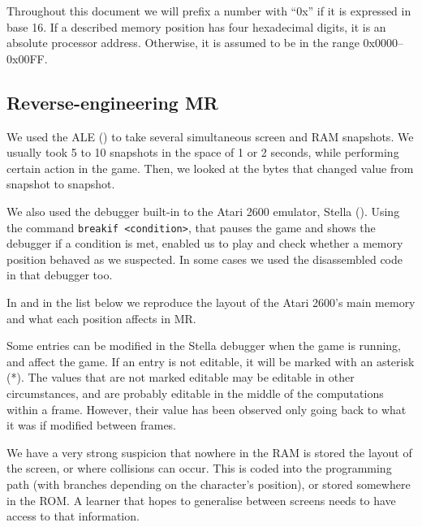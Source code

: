 Throughout this document we will prefix a number with ``0x'' if it is expressed
in base 16. If a described memory position has four hexadecimal digits, it is an
absolute processor address. Otherwise, it is assumed to be in the range
0x0000--0x00FF.


\subsection{Reverse-engineering \acl{MR}\label{subsec:rev-eng-mr}}
We used the \acl{ALE} (\cite{bellemare2013arcade}) to take several simultaneous
screen and \ac{RAM} snapshots. We usually took 5 to 10 snapshots in the space of
1 or 2 seconds, while performing certain action in the game. Then, we looked at
the bytes that changed value from snapshot to snapshot.

We also used the debugger built-in to the Atari 2600 emulator, Stella
(\cite{stella}). Using the command \verb-breakif <condition>-, that pauses the
game and shows the debugger if a condition is met, enabled us to play and check
whether a memory position behaved as we suspected. In some cases we used the
disassembled code in that debugger too.

In  and in the list below we reproduce the layout of
the Atari 2600's main memory and what each position affects in \acl{MR}.

Some entries can be modified in the Stella debugger when the game is running,
and affect the game. If an entry is not editable, it will be marked with an
asterisk (*). The values that are not marked editable may be editable in other
circumstances, and are probably editable in the middle of the computations
within a frame. However, their value has been observed only going back to what
it was if modified between frames.

We have a very strong suspicion that nowhere in the \ac{RAM} is stored the
layout of the screen, or where collisions can occur. This is coded into the
programming path (with branches depending on the character's position), or
stored somewhere in the ROM. A learner that hopes to generalise between screens
needs to have access to that information.

